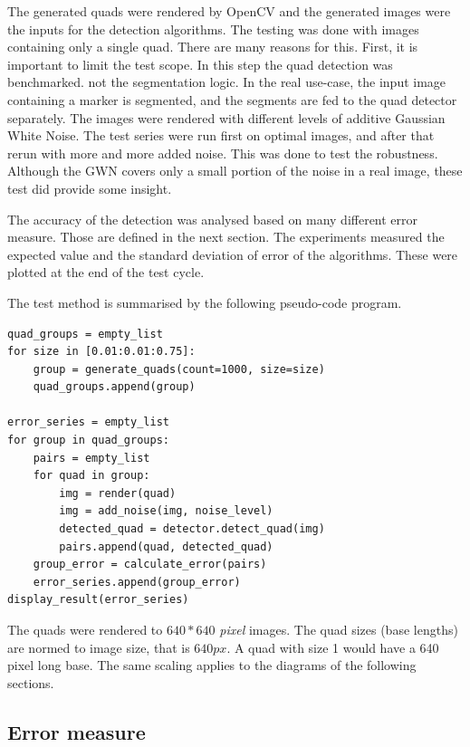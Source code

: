 The generated quads were rendered by OpenCV and the generated images were the inputs for the detection algorithms.
The testing was done with images containing only a single quad.
There are many reasons for this.
First, it is important to limit the test scope.
In this step the quad detection was benchmarked. not the segmentation logic.
In the real use-case, the input image containing a marker is segmented, and the segments are fed to the quad detector separately.
The images were rendered with different levels of additive Gaussian White Noise.
The test series were run first on optimal images, and after that rerun with more and more added noise.
This was done to test the robustness.
Although the GWN covers only a small portion of the noise in a real image, these test did provide some insight.

The accuracy of the detection was analysed based on many different error measure.
Those are defined in the next section.
The experiments measured the expected value and the standard deviation of error of the algorithms.
These were plotted at the end of the test cycle.

The test method is summarised by the following pseudo-code program.
\begin{lstlisting}
quad_groups = empty_list
for size in [0.01:0.01:0.75]:
	group = generate_quads(count=1000, size=size)
	quad_groups.append(group)

error_series = empty_list
for group in quad_groups:
	pairs = empty_list
	for quad in group:
		img = render(quad)
		img = add_noise(img, noise_level)
		detected_quad = detector.detect_quad(img)
		pairs.append(quad, detected_quad)
	group_error = calculate_error(pairs)
	error_series.append(group_error)
display_result(error_series)	
\end{lstlisting}

The quads were rendered to $640*640$ \textit{pixel} images.
The quad sizes (base lengths) are normed to image size, that is $640 px$.
A quad with size 1 would have a 640 pixel long base.
The same scaling applies to the diagrams of the following sections. 

\subsection{Error measure}

